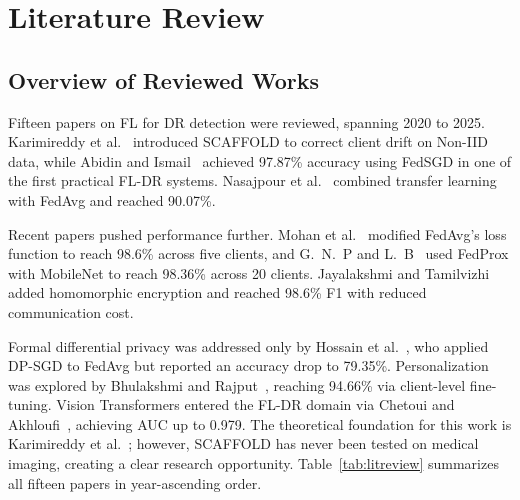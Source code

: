 \documentclass[10pt, conference]{IEEEtran}
\begin{document}
\section{Literature Review}

\subsection{Overview of Reviewed Works}

Fifteen papers on FL for DR detection were reviewed, spanning 2020 to 2025.
Karimireddy et al.~\cite{r5} introduced SCAFFOLD to correct client drift on
Non-IID data, while Abidin and Ismail~\cite{r7} achieved 97.87\% accuracy using
FedSGD in one of the first practical FL-DR systems. Nasajpour et al.~\cite{r6}
combined transfer learning with FedAvg and reached 90.07\%.

Recent papers pushed performance further. Mohan et al.~\cite{r10} modified
FedAvg's loss function to reach 98.6\% across five clients, and G.~N.~P and
L.~B~\cite{r14} used FedProx with MobileNet to reach 98.36\% across 20 clients.
Jayalakshmi and Tamilvizhi~\cite{r2} added homomorphic encryption and reached
98.6\% F1 with reduced communication cost.

Formal differential privacy was addressed only by Hossain et al.~\cite{r12},
who applied DP-SGD to FedAvg but reported an accuracy drop to 79.35\%.
Personalization was explored by Bhulakshmi and Rajput~\cite{r3}, reaching
94.66\% via client-level fine-tuning. Vision Transformers entered the FL-DR
domain via Chetoui and Akhloufi~\cite{r4}, achieving AUC up to 0.979. The
theoretical foundation for this work is Karimireddy et al.~\cite{r5}; however,
SCAFFOLD has never been tested on medical imaging, creating a clear research
opportunity. Table~\ref{tab:litreview} summarizes all fifteen papers in
year-ascending order.
\end{document}
